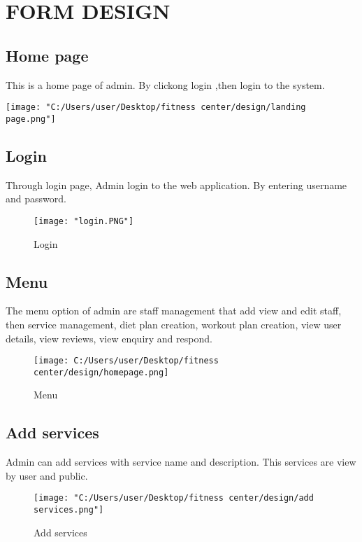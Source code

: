 \documentclass[a4paper,12pt,toc=flat]{report}
\begin{document}
{{	\pagebreak
	
	\section{FORM DESIGN}
	\subsection{Home page}
\hspace*{12pt}
	This is a home page of admin. By clickong login ,then login to the system.
	\begin{center}
		\texttt{[image: "C:/Users/user/Desktop/fitness center/design/landing page.png"]}
	\end{center}
	\pagebreak
	\subsection{Login}
	 \hspace*{12pt} Through login page, Admin login to the web application. By entering username and password. 
	\begin{figure}[bph]
		\begin{center}
			\texttt{[image: "login.PNG"]}
		\end{center}
		\caption{Login}
	\end{figure}
	\pagebreak	
	\subsection{Menu}
	\hspace*{12pt} The menu option of admin are staff management that add view and edit staff, then service management, diet plan creation, workout plan creation, view user details, view reviews, view enquiry and respond.
	\begin{figure}[bph] 
		\begin{center}
			\texttt{[image: C:/Users/user/Desktop/fitness center/design/homepage.png]}
			
		\end{center}
		\caption{Menu}
	\end{figure}
	\pagebreak	
	




	\subsection{Add services}
	 \hspace*{12pt} Admin can add services with service name and description. This services are view by user and public.
	\begin{figure}[bph] 
	\begin{center}
		\texttt{[image: "C:/Users/user/Desktop/fitness center/design/add services.png"]}
	\end{center}
	\caption{Add services}
\end{figure}
\pagebreak
}}
\end{document}
